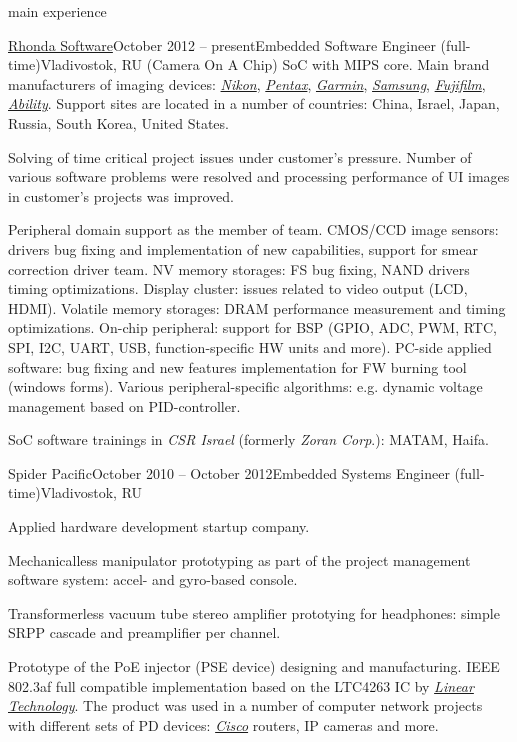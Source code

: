 \documentclass{template}
\begin{document}
\begin{rSection}{main experience}
\begin{rCompany}{\href{http://www.rhondasoftware.com}{Rhonda Software}}{October 2012 -- present}{Embedded Software Engineer (full-time)}{Vladivostok, RU}
      (Camera On A Chip) SoC with MIPS core.
      Main brand manufacturers of imaging devices: \href{http://www.nikon.com}{\textit{Nikon}}, \href{http://www.pentax.com}{\textit{Pentax}},
      \href{http://www.garmin.com}{\textit{Garmin}}, \href{http://www.samsung.com}{\textit{Samsung}}, \href{http://www.fujifilm.com}{\textit{Fujifilm}},
      \href{http://www.abilitycorp.com.tw}{\textit{Ability}}. Support sites are located in a number of countries: China, Israel, Japan, Russia,
      South Korea, United States.
\item Solving of time critical project issues under customer's pressure. Number of various  software problems were resolved
      and processing performance of UI images in customer's projects was improved.
\item Peripheral domain support as the member of team. CMOS/CCD image sensors: drivers bug fixing and implementation of new capabilities, support
      for smear correction driver team. NV memory storages: FS bug fixing, NAND drivers timing optimizations. Display cluster: issues
      related to video output (LCD, HDMI). Volatile memory storages: DRAM performance measurement and timing optimizations. On-chip peripheral:
      support for BSP (GPIO, ADC, PWM, RTC, SPI, I2C, UART, USB, function-specific HW units and more). PC-side applied software: bug
      fixing and new features implementation for FW burning tool (windows forms). Various peripheral-specific algorithms: e.g. dynamic
      voltage management based on PID-controller.
\item SoC software trainings in \textit{CSR Israel} (formerly \textit{Zoran Corp}.): MATAM, Haifa.

\end{rCompany}
\begin{rCompany}{Spider Pacific}{October 2010 -- October 2012}{Embedded Systems Engineer (full-time)}{Vladivostok, RU}

\item Applied hardware development startup company.
\item Mechanicalless manipulator prototyping as part of the project management software system: accel- and gyro-based console.
\item Transformerless vacuum tube stereo amplifier prototying for headphones: simple SRPP cascade and preamplifier per channel.
\item Prototype of the PoE injector (PSE device) designing and manufacturing. IEEE 802.3af full compatible implementation based on the LTC4263 IC by
      \href{http://www.linear.com}{\textit{Linear Technology}}. The product was used in a number of computer network projects with different
      sets of PD devices: \href{http://www.cisco.com}{\textit{Cisco}} routers, IP cameras and more.

\end{rCompany}
\end{rSection}
\end{document}
